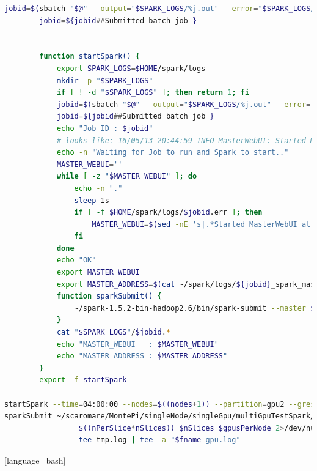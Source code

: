 \begin{frame}[fragile]
    \begin{lstlisting}[language=bash]
        jobid=$(sbatch "$@" --output="$SPARK_LOGS/%j.out" --error="$SPARK_LOGS/%j.err" $HOME/scaromare/start_spark_slurm.sh)
        jobid=${jobid##Submitted batch job }


        function startSpark() {
            export SPARK_LOGS=$HOME/spark/logs
            mkdir -p "$SPARK_LOGS"
            if [ ! -d "$SPARK_LOGS" ]; then return 1; fi
            jobid=$(sbatch "$@" --output="$SPARK_LOGS/%j.out" --error="$SPARK_LOGS/%j.err" $HOME/scaromare/start_spark_slurm.sh)
            jobid=${jobid##Submitted batch job }
            echo "Job ID : $jobid"
            # looks like: 16/05/13 20:44:59 INFO MasterWebUI: Started MasterWebUI at http://172.24.36.19:8080
            echo -n "Waiting for Job to run and Spark to start.."
            MASTER_WEBUI=''
            while [ -z "$MASTER_WEBUI" ]; do
                echo -n "."
                sleep 1s
                if [ -f $HOME/spark/logs/$jobid.err ]; then
                    MASTER_WEBUI=$(sed -nE 's|.*Started MasterWebUI at (http://[0-9.:]*)|\1|p' $HOME/spark/logs/$jobid.err)
                fi
            done
            echo "OK"
            export MASTER_WEBUI
            export MASTER_ADDRESS=$(cat ~/spark/logs/${jobid}_spark_master)
            function sparkSubmit() {
                ~/spark-1.5.2-bin-hadoop2.6/bin/spark-submit --master $MASTER_ADDRESS $@
            }
            cat "$SPARK_LOGS"/$jobid.*
            echo "MASTER_WEBUI   : $MASTER_WEBUI"
            echo "MASTER_ADDRESS : $MASTER_ADDRESS"
        }
        export -f startSpark

startSpark --time=04:00:00 --nodes=$((nodes+1)) --partition=gpu2 --gres=gpu:$gpusPerNode --cpus-per-task=$coresPerNode
sparkSubmit ~/scaromare/MontePi/singleNode/singleGpu/multiGpuTestSpark/MontePi.jar \
                 $((nPerSlice*nSlices)) $nSlices $gpusPerNode 2>/dev/null |
                 tee tmp.log | tee -a "$fname-gpu.log"
    \end{lstlisting}[language=bash]
\end{frame}



